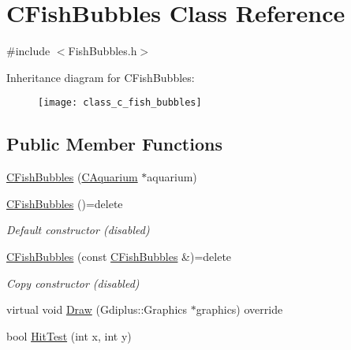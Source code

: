 \hypertarget{class_c_fish_bubbles}{}\section{C\+Fish\+Bubbles Class Reference}
\label{class_c_fish_bubbles}


{\ttfamily \#include $<$Fish\+Bubbles.\+h$>$}

Inheritance diagram for C\+Fish\+Bubbles\+:\begin{figure}[H]
\begin{center}
\leavevmode
\texttt{[image: class\_c\_fish\_bubbles]}
\end{center}
\end{figure}
\subsection*{Public Member Functions}
\begin{DoxyCompactItemize}
\item 
\mbox{\hyperlink{class_c_fish_bubbles_a6ddfdd2f56bd59205792c2faebc4d724}{C\+Fish\+Bubbles}} (\mbox{\hyperlink{class_c_aquarium}{C\+Aquarium}} $\ast$aquarium)
\item 
\mbox{\label{class_c_fish_bubbles_a18a1894d93bcc06b670f6c47b934c17b}} 
\mbox{\hyperlink{class_c_fish_bubbles_a18a1894d93bcc06b670f6c47b934c17b}{C\+Fish\+Bubbles}} ()=delete
\begin{DoxyCompactList}\small\item\em Default constructor (disabled) \end{DoxyCompactList}\item 
\mbox{\label{class_c_fish_bubbles_a07c839542cb649a05f29ffd0e245c38b}} 
\mbox{\hyperlink{class_c_fish_bubbles_a07c839542cb649a05f29ffd0e245c38b}{C\+Fish\+Bubbles}} (const \mbox{\hyperlink{class_c_fish_bubbles}{C\+Fish\+Bubbles}} \&)=delete
\begin{DoxyCompactList}\small\item\em Copy constructor (disabled) \end{DoxyCompactList}\item 
virtual void \mbox{\hyperlink{class_c_fish_bubbles_aab256406ae44edb059c3acdaf07ebd12}{Draw}} (Gdiplus\+::\+Graphics $\ast$graphics) override
\item 
bool \mbox{\hyperlink{class_c_fish_bubbles_a34b8f3c613f04b7ef9a06a6fcbce5be2}{Hit\+Test}} (int x, int y)
\end{DoxyCompactItemize}
